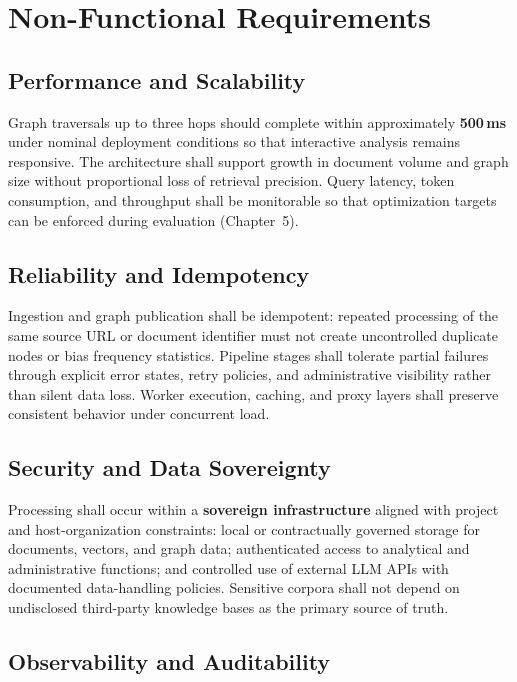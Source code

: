 \section{Non-Functional Requirements}

\subsection{Performance and Scalability}

Graph traversals up to three hops should complete within approximately \textbf{500\,ms} under nominal deployment conditions so that interactive analysis remains responsive. The architecture shall support growth in document volume and graph size without proportional loss of retrieval precision. Query latency, token consumption, and throughput shall be monitorable so that optimization targets can be enforced during evaluation (Chapter~5).

\subsection{Reliability and Idempotency}

Ingestion and graph publication shall be idempotent: repeated processing of the same source URL or document identifier must not create uncontrolled duplicate nodes or bias frequency statistics. Pipeline stages shall tolerate partial failures through explicit error states, retry policies, and administrative visibility rather than silent data loss. Worker execution, caching, and proxy layers shall preserve consistent behavior under concurrent load.

\subsection{Security and Data Sovereignty}

Processing shall occur within a \textbf{sovereign infrastructure} aligned with project and host-organization constraints: local or contractually governed storage for documents, vectors, and graph data; authenticated access to analytical and administrative functions; and controlled use of external LLM APIs with documented data-handling policies. Sensitive corpora shall not depend on undisclosed third-party knowledge bases as the primary source of truth.

\subsection{Observability and Auditability}

